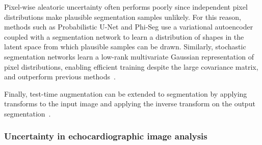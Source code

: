 Pixel-wise aleatoric uncertainty often performs poorly since independent pixel distributions make plausible segmentation samples unlikely. For this reason, methods such as Probabilistic U-Net \cite{prob-unet} and Phi-Seg \cite{phiseg} use a variational autoencoder coupled with a segmentation network to learn a distribution of shapes in the latent space from which plausible samples can be drawn. Similarly, stochastic segmentation networks learn a low-rank multivariate Gaussian representation of pixel distributions, enabling efficient training despite the large covariance matrix, and outperform previous methods~\cite{stochastic_seg_net}.


Finally, test-time augmentation can be extended to segmentation by applying transforms to the input image and applying the inverse transform on the output segmentation~\cite{WANG2019_tta_seg}. 


\subsubsection{Uncertainty in echocardiographic image analysis}

